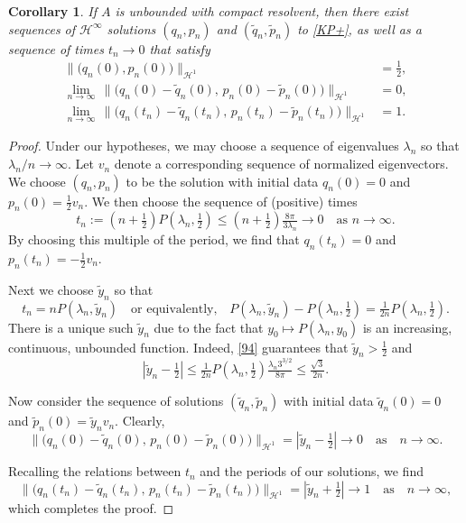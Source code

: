 \documentclass{amsart}
\newcommand{\qtq}[1]{\quad\text{#1}\quad}
\newtheorem{corollary}[theorem]{Corollary}
\theoremstyle{definition}
\numberwithin{equation}{section}
\renewcommand{\H}{\mathcal H}
\begin{document}
\begin{corollary}\label{C:95}
If $A$ is unbounded with compact resolvent, then there exist sequences of $\H^\infty$ solutions $(q_n,p_n)$ and $(\tilde q_n,\tilde  p_n)$ to \eqref{KP+}, as well as a sequence of times $t_n\to 0$ that satisfy
\begin{align}\label{95a}
\bigl\| \bigl(q_n(0), p_n(0)\bigr) \bigr\|_{\H^1} &= \tfrac12, \\
\label{95b}
\lim_{n\to \infty}\,\bigl\| \bigl(q_n(0)-\tilde q_n(0),\, p_n(0)-\tilde p_n(0)\bigr) \bigr\|_{\H^1}  &= 0, \\
\label{95c}
\lim_{n\to \infty}\,\bigl\| \bigl(q_n(t_n)-\tilde q_n(t_n),\, p_n(t_n)-\tilde p_n(t_n)\bigr) \bigr\|_{\H^1} &= 1.
\end{align}
\end{corollary}

\begin{proof}
Under our hypotheses, we may choose a sequence of eigenvalues $\lambda_n$ so that $\lambda_n/n\to\infty$.  Let $v_n$ denote a corresponding sequence of normalized eigenvectors.  We choose $(q_n,p_n)$ to be the solution with initial data $q_n(0)=0$ and $p_n(0)=\frac12 v_n$.  We then choose the sequence of (positive) times
\begin{equation*}
t_n := (n+\tfrac12) P(\lambda_n, \tfrac12) \leq (n+\tfrac12) \tfrac{8\pi}{3\lambda_n} \to 0 \quad\text{as $n\to\infty$.}
\end{equation*}
By choosing this multiple of the period, we find that $q_n(t_n)=0$ and $p_n(t_n)=-\frac12 v_n$.

Next we choose $\tilde y_n$ so that
$$
t_n = n P(\lambda_n, \tilde y_n) \qtq{or equivalently,}  P(\lambda_n, \tilde y_n) - P(\lambda_n, \tfrac12) = \tfrac{1}{2n} P(\lambda_n, \tfrac12).
$$
There is a unique such $\tilde y_n$ due to the fact that $y_0\mapsto P(\lambda_n, y_0)$ is an increasing, continuous, unbounded function.  Indeed, \eqref{94} guarantees that $\tilde y_n > \tfrac12$ and
\begin{equation*}
| \tilde y_n - \tfrac 12 | \leq  \tfrac{1}{2n} P(\lambda_n, \tfrac12) \tfrac{\lambda_n 3^{3/2}}{8\pi} \leq \tfrac{\sqrt{3}}{2n} .
\end{equation*} 

Now consider the sequence of solutions $(\tilde q_n,\tilde  p_n)$ with initial data $\tilde q_n(0)=0$ and $\tilde  p_n(0)=\tilde y_n v_n$.  Clearly,
\begin{equation*}
\bigl\| \bigl(q_n(0)-\tilde q_n(0),\, p_n(0)-\tilde p_n(0)\bigr) \bigr\|_{\H^1} = | \tilde y_n - \tfrac 12 | \to 0 \qtq{as} n\to \infty.
\end{equation*}

Recalling the relations between $t_n$ and the periods of our solutions, we find
\begin{equation*}
\bigl\| \bigl(q_n(t_n)-\tilde q_n(t_n),\, p_n(t_n)-\tilde p_n(t_n)\bigr) \bigr\|_{\H^1} = | \tilde y_n + \tfrac 12 | \to 1 \qtq{as} n\to \infty,
\end{equation*}
which completes the proof.
\end{proof}
\end{document}
